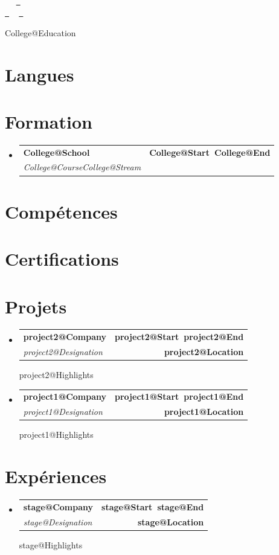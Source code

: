 \documentclass[letterpaper,11pt]{article}
\makeatletter
\newcommand{\describe}[2]{\csname #1@#2\endcsname}
\newcommand{\resumeSubheading}[4]{
  \vspace{-2pt}\item
    \begin{tabular*}{1.0\textwidth}[t]{l@{\extracolsep{\fill}}r}
      \textbf{#1} & \textbf{\small #2} \\
      \textit{\small#3} & \textbf{\small #4} \\
    \end{tabular*}\vspace{-7pt}
}
\newcommand{\resumeSubHeadingListStart}{\begin{itemize}[leftmargin=0.0in, label={}]}
\newcommand{\resumeSubHeadingListEnd}{\end{itemize}}
\def\titlesection{
\begin{center}
    {\Huge \scshape \firstname \ \lastname} \\ \vspace{1pt}
    \small \raisebox{-0.1\height}\faPhone\ \jasphone ~ \href{mailto:\email}{\raisebox{-0.2\height}\faEnvelope\  \underline{\email}} \\
    \href{\linkedin}{\raisebox{-0.2\height}\faLinkedin\ \underline{\linkedin}}  ~
    \href{\github}{\raisebox{-0.2\height}\faGithub\ \underline{\github}}
    \vspace{-8pt}
\end{center}
}
\makeatother
\begin{document}
\titlesection

\describe{College}{Education}

\vspace{1em}

\section{Langues}
\langs
\vspace{1em}

\section{Formation}
  \resumeSubHeadingListStart
      \resumeSubheading{\csname College@School\endcsname}
      {\csname College@Start\endcsname \ \csname College@End\endcsname}
      {\csname College@Course\endcsname \csname College@Stream\endcsname}{}
  \resumeSubHeadingListEnd

\section{Compétences}
\skills

\section{Certifications}
\certifications

\newcommand{\renderExp}[1]{
  \resumeSubheading
      {\csname #1@Company\endcsname}{\csname #1@Start\endcsname \ \csname #1@End\endcsname}
      {\csname #1@Designation\endcsname}{\csname #1@Location\endcsname}
      \csname #1@Highlights\endcsname
}

\section{Projets}
  \resumeSubHeadingListStart
    \renderExp{project2}
    \renderExp{project1} 
  \resumeSubHeadingListEnd

\section{Expériences}
  \resumeSubHeadingListStart
    \renderExp{stage}
  \resumeSubHeadingListEnd
\end{document}
